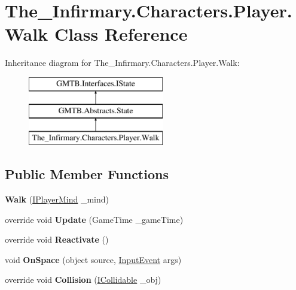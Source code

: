 \hypertarget{class_the___infirmary_1_1_characters_1_1_player_1_1_walk}{}\section{The\+\_\+\+Infirmary.\+Characters.\+Player.\+Walk Class Reference}
\label{class_the___infirmary_1_1_characters_1_1_player_1_1_walk}
Inheritance diagram for The\+\_\+\+Infirmary.\+Characters.\+Player.\+Walk\+:\begin{figure}[H]
\begin{center}
\leavevmode
\includegraphics[height=3.000000cm]{class_the___infirmary_1_1_characters_1_1_player_1_1_walk}
\end{center}
\end{figure}
\subsection*{Public Member Functions}
\begin{DoxyCompactItemize}
\item 
\mbox{\label{class_the___infirmary_1_1_characters_1_1_player_1_1_walk_ad6220b103c2f0893352d8b11edf81f13}} 
{\bfseries Walk} (\mbox{\hyperlink{interface_g_m_t_b_1_1_interfaces_1_1_i_player_mind}{I\+Player\+Mind}} \+\_\+mind)
\item 
\mbox{\label{class_the___infirmary_1_1_characters_1_1_player_1_1_walk_af18d58c553ec909ec9fb5a43d02793b9}} 
override void {\bfseries Update} (Game\+Time \+\_\+game\+Time)
\item 
\mbox{\label{class_the___infirmary_1_1_characters_1_1_player_1_1_walk_a2232a46c448b95eb95e13d446e6800e7}} 
override void {\bfseries Reactivate} ()
\item 
\mbox{\label{class_the___infirmary_1_1_characters_1_1_player_1_1_walk_a822618908e87387c2e3c6afc08c0728c}} 
void {\bfseries On\+Space} (object source, \mbox{\hyperlink{class_g_m_t_b_1_1_input_system_1_1_input_event}{Input\+Event}} args)
\item 
\mbox{\label{class_the___infirmary_1_1_characters_1_1_player_1_1_walk_a4403970d50899e2b7c5cd6d13a8ead9c}} 
override void {\bfseries Collision} (\mbox{\hyperlink{interface_g_m_t_b_1_1_collision_system_1_1_i_collidable}{I\+Collidable}} \+\_\+obj)
\end{DoxyCompactItemize}
